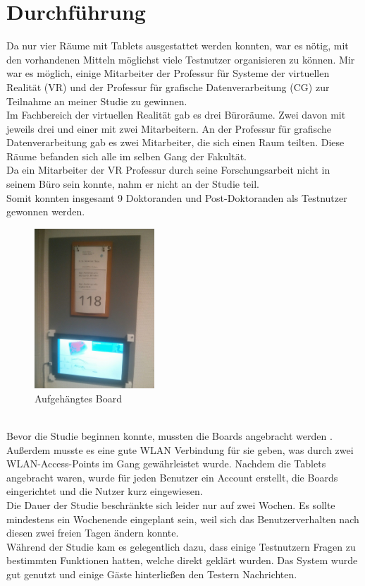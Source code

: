 \section{Durchführung}\label{Durchführung}
Da nur vier Räume mit Tablets ausgestattet werden konnten, war es nötig, mit den vorhandenen Mitteln möglichst viele Testnutzer organisieren zu können.
Mir war es möglich, einige Mitarbeiter der Professur für Systeme der virtuellen Realität (VR) und der Professur für grafische Datenverarbeitung (CG) zur Teilnahme an meiner Studie zu gewinnen.
\\
Im Fachbereich der virtuellen Realität gab es drei Büroräume.
Zwei davon mit jeweils drei und einer mit zwei Mitarbeitern.
An der Professur für grafische Datenverarbeitung gab es zwei Mitarbeiter, die sich einen Raum teilten.
Diese Räume befanden sich alle im selben Gang der Fakultät.
\\
Da ein Mitarbeiter der VR Professur durch seine Forschungsarbeit nicht in seinem Büro sein konnte, nahm er nicht an der Studie teil.
\\
Somit konnten insgesamt 9 Doktoranden und Post-Doktoranden als Testnutzer gewonnen werden.
\begin{figure}[h!]
  \centering
  \includegraphics[width=0.4\textwidth]{./img/StudieAufgehaengtesBoard.jpg}
  \caption{Aufgehängtes Board}
  \label{img:StudieAufgehaengesBoard}
\end{figure}
\\
Bevor die Studie beginnen konnte, mussten die Boards angebracht werden .
Außerdem musste es eine gute WLAN Verbindung für sie geben, was durch zwei WLAN-Access-Points im Gang gewährleistet wurde.
Nachdem die Tablets angebracht waren, wurde für jeden Benutzer ein Account erstellt, die Boards eingerichtet und die Nutzer kurz eingewiesen.
\\
Die Dauer der Studie beschränkte sich leider nur auf zwei Wochen.
Es sollte mindestens ein Wochenende eingeplant sein, weil sich das Benutzerverhalten nach diesen zwei freien Tagen ändern konnte.
\\
Während der Studie kam es gelegentlich dazu, dass einige Testnutzern Fragen zu bestimmten Funktionen hatten, welche direkt geklärt wurden.
Das System wurde gut genutzt und einige Gäste hinterließen den Testern Nachrichten.



